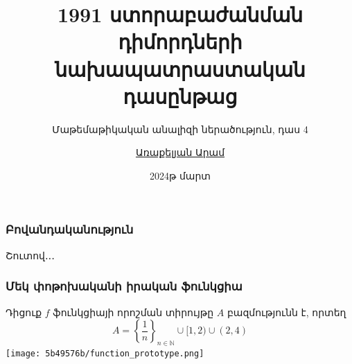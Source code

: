 \documentclass[aspectratio=169]{beamer} %
\title[մաթ․ անալիզ - դաս 3]{1991 ստորաբաժանման դիմորդների նախապատրաստական դասընթաց}
\subtitle{Մաթեմաթիկական անալիզի ներածություն, դաս 4}
\author[Առաքելյան Ա․]{
    \href{mailto:aram.arakeljan@gmail.com}{Առաքելյան Արամ}
}
\institute{\href{https://1991.mil.am/}{«1991» ակադեմիա}}
\date{2024թ մարտ}
\begin{document}
    \begin{frame}
        \titlepage
    \end{frame}
    \begin{frame}
        \frametitle{Բովանդականություն}
        \centering
        Շուտով․․․
    \end{frame}
    \begin{frame}
        \frametitle{Մեկ փոթոխականի իրական ֆունկցիա}
        Դիցուք $f$ ֆունկցիայի որոշման տիրույթը $A$ բազմությունն է, որտեղ
        \[A = \left\{\frac{1}{n}\right\}_{n \in \mathbb{N}} \cup [1, 2) \cup (2, 4)\]
        \centering \texttt{[image: 5b49576b/function\_prototype.png]}
    \end{frame}
\end{document}

